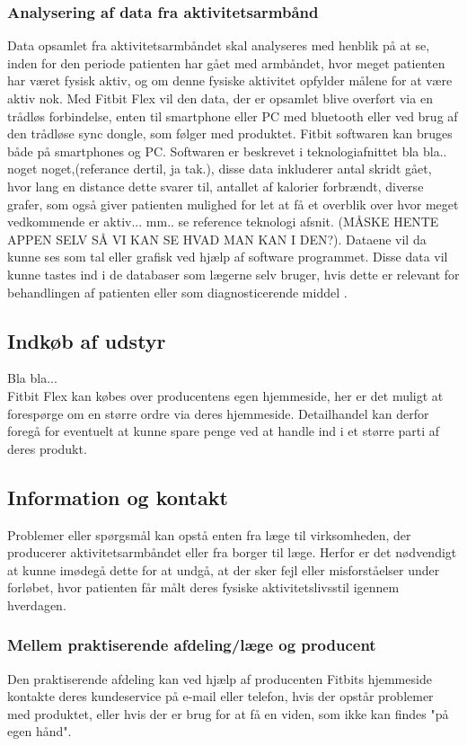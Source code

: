\subsubsection{Analysering af data fra aktivitetsarmbånd}  
Data opsamlet fra aktivitetsarmbåndet skal analyseres med henblik på at se, inden for den periode patienten har gået med armbåndet, hvor meget patienten har været fysisk aktiv, og om denne fysiske aktivitet opfylder målene for at være aktiv nok.  
Med Fitbit Flex vil den data, der er opsamlet blive overført via en trådløs forbindelse, enten til smartphone eller PC med bluetooth eller ved brug af den trådløse sync dongle, som følger med produktet. Fitbit softwaren kan bruges både på smartphones og PC. Softwaren er beskrevet i teknologiafnittet bla bla.. noget noget,(referance dertil, ja tak.), disse data inkluderer antal skridt gået, hvor lang en distance dette svarer til, antallet af kalorier forbrændt, diverse grafer, som også giver patienten mulighed for let at få et overblik over hvor meget vedkommende er aktiv... mm.. se reference teknologi afsnit. (MÅSKE HENTE APPEN SELV SÅ VI KAN SE HVAD MAN KAN I DEN?). Dataene vil da kunne ses som tal eller grafisk ved hjælp af software programmet. Disse data vil kunne tastes ind i de databaser som lægerne selv bruger, hvis dette er relevant for behandlingen af patienten eller som diagnosticerende middel \citep{fitbitflex}.

\subsection{Indkøb af udstyr}	
Bla bla...\\
Fitbit Flex kan købes over producentens egen hjemmeside, her er det muligt at forespørge om en større ordre via deres hjemmeside. Detailhandel kan derfor foregå for eventuelt at kunne spare penge ved at handle ind i et større parti af deres produkt.

\subsection{Information og kontakt}
Problemer eller spørgsmål kan opstå enten fra læge til virksomheden, der producerer aktivitetsarmbåndet eller fra borger til læge. Herfor er det nødvendigt at kunne imødegå dette for at undgå, at der sker fejl eller misforståelser under forløbet, hvor patienten får målt deres fysiske aktivitetslivsstil igennem hverdagen. 

\subsubsection{Mellem praktiserende afdeling/læge og producent}
Den praktiserende afdeling kan ved hjælp af producenten Fitbits hjemmeside kontakte deres kundeservice på e-mail eller telefon, hvis der opstår problemer med produktet, eller hvis der er brug for at få en viden, som ikke kan findes "på egen hånd". 

